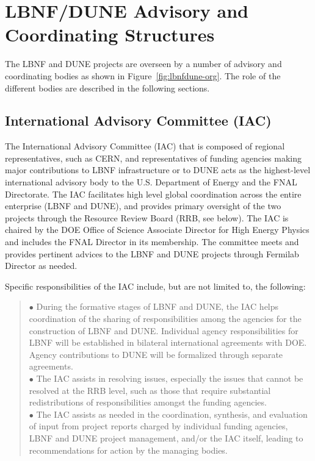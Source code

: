 \section{LBNF/DUNE Advisory and Coordinating Structures}
\label{sec:lbnf-dune-interface}

The LBNF and DUNE projects are overseen by a number of advisory and
coordinating bodies as shown in Figure~\ref{fig:lbnfdune-org}.
The role of the different bodies are described in the following sections.  

\subsection{International Advisory Committee (IAC) }

The International Advisory Committee (IAC) that is composed of
regional representatives, such as CERN, and representatives of
funding agencies making major contributions to LBNF infrastructure or to DUNE
acts as the highest-level international advisory body to the U.S.
Department of Energy and the FNAL Directorate. The IAC facilitates
high level global coordination across the entire enterprise (LBNF and DUNE),
and provides primary oversight of the two projects through
the Resource Review Board (RRB, see below). 
The IAC is chaired by the DOE Office of Science Associate Director
for High Energy Physics and includes the FNAL Director in its membership.  
The committee meets and provides pertinent advices to the LBNF and DUNE
projects through Fermilab Director as needed.  

Specific responsibilities of the IAC include, but are not limited to,
the following: 

\begin{quote}
$\bullet$ During the formative stages of LBNF and DUNE,
the IAC helps coordination of the sharing of responsibilities among
the agencies for the construction of LBNF and DUNE.
Individual agency responsibilities for LBNF will be established in
bilateral international agreements with DOE. Agency contributions to
DUNE will be formalized through separate agreements.\\
$\bullet$ The IAC assists in resolving issues, especially the
issues that cannot be resolved at the RRB level, such as those that
require substantial redistributions of responsibilities amongst the
funding agencies.\\
$\bullet$ The IAC assists as needed in the coordination,
synthesis, and evaluation of input from project reports charged by
individual funding agencies, LBNF and DUNE project management,
and/or the IAC itself, leading to recommendations for action by
the managing bodies.
\end{quote}

